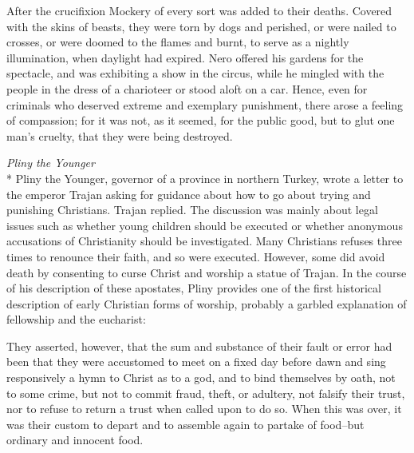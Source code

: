 \documentclass[10pt,a5paper,twoside]{article}
\newcommand{\quotesize}{\normalsize{}}
\newcommand{\comm}[1]{\begingroup \color{black!50} #1\endgroup}
\newenvironment{quotetext}{\begingroup\quotesize}{\endgroup}
\newcommand{\subhead}[1]{\emph{#1}\\*}
\begin{document}
\begin{section}{After the crucifixion}
\begin{quotetext}
Mockery of every sort was added to their deaths. Covered with the
skins of beasts, they were torn by dogs and perished, or were nailed
to crosses, or were doomed to the flames and burnt, to serve as a
nightly illumination, when daylight had expired. Nero offered his
gardens for the spectacle, and was exhibiting a show in the circus,
while he mingled with the people in the dress of a charioteer or stood
aloft on a car. Hence, even for criminals who deserved extreme and
exemplary punishment, there arose a feeling of compassion; for it was
not, as it seemed, for the public good, but to glut one man's cruelty,
that they were being destroyed.
\end{quotetext}

\subhead{Pliny the Younger}\label{pliny}
%
%
\comm{Pliny the Younger, governor of a province in northern Turkey, wrote a letter to the emperor Trajan
asking for guidance about how to go about trying and punishing Christians. Trajan replied. The discussion was
mainly about legal issues such as whether young children should be executed or whether anonymous accusations
of Christianity should be investigated. Many Christians refuses three times to renounce their faith, and so were
executed. However, some did avoid death by consenting to curse Christ and worship a statue of Trajan. In the course
of his description of these apostates, Pliny provides one of the first historical description of early Christian
forms of worship, probably a garbled explanation of fellowship and the eucharist:}

\begin{quotetext}
They asserted, however, that the sum and substance of their fault or error had been that they were accustomed to meet on a fixed day before dawn and sing responsively a hymn to Christ as to a god, and to bind themselves by oath, not to some crime, but not to commit fraud, theft, or adultery, not falsify their trust, nor to refuse to return a trust when called upon to do so. When this was over, it was their custom to depart and to assemble again to partake of food--but ordinary and innocent food.
\end{quotetext}

\end{section}

\vfill\pagebreak

\end{document}
